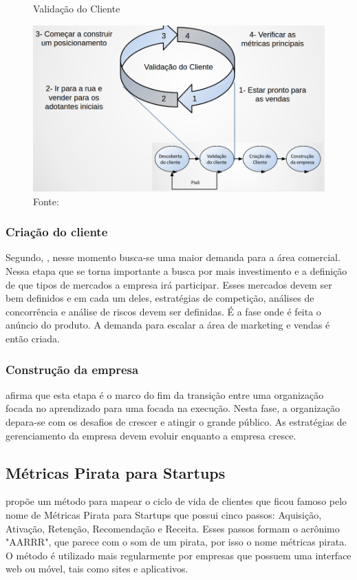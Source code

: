 \begin{figure}[H]
\caption{Validação do Cliente}
\centerline{\includegraphics[scale=0.5]{img/validacao_do_cliente}}
\label{fig:validacao_do_cliente}
\caption* {Fonte: }
\end{figure}

\subsubsection{Criação do cliente}
\label{cha:criacao_do_cliente}
Segundo, , nesse momento busca-se uma maior demanda para a área comercial. Nessa etapa que se torna importante a busca por mais investimento e a definição de que tipos de mercados a empresa irá participar. Esses mercados devem ser bem definidos e em cada um deles, estratégias de competição, análises de concorrência e análise de riscos devem ser definidas. É a fase onde é feita o anúncio do produto. A demanda para escalar a área de marketing e vendas é então criada.

\subsubsection{Construção da empresa}
\label{cha:construcao_da_empresa}
 afirma que esta etapa é o marco do fim da transição entre uma organização focada no aprendizado para uma focada na execução. Nesta fase, a organização depara-se com os desafios de crescer e atingir o grande público. As estratégias de gerenciamento da empresa devem evoluir enquanto a empresa cresce.

\subsection{Métricas Pirata para Startups}
\label{cha:metricas_pirata}
 propõe um método para mapear o ciclo de vida de clientes que ficou famoso pelo nome de Métricas Pirata para Startups que possui cinco passos: Aquisição, Ativação, Retenção, Recomendação e Receita. Esses passos formam o acrônimo "AARRR", que parece com o som de um pirata, por isso o nome métricas pirata.
O método é utilizado mais regularmente por empresas que possuem uma interface web ou móvel, tais como sites e aplicativos.

